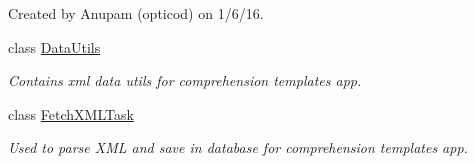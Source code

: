 \begin{DoxyCompactItemize}
\begin{DoxyCompactList}
Created by Anupam (opticod) on 1/6/16. \end{DoxyCompactList}\item 
class \hyperlink{classorg_1_1buildmlearn_1_1comprehension_1_1data_1_1DataUtils}{Data\+Utils}
\begin{DoxyCompactList}\small\item\em Contains xml data utils for comprehension template\textquotesingle{}s app. \end{DoxyCompactList}\item 
class \hyperlink{classorg_1_1buildmlearn_1_1comprehension_1_1data_1_1FetchXMLTask}{Fetch\+X\+M\+L\+Task}
\begin{DoxyCompactList}\small\item\em Used to parse X\+ML and save in database for comprehension template\textquotesingle{}s app. \end{DoxyCompactList}\end{DoxyCompactItemize}
